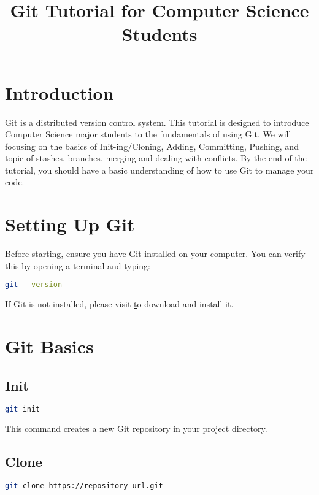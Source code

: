 \documentclass{article}
\title{Git Tutorial for Computer Science Students}
\author{}
\date{}
\begin{document}
\maketitle

\section{Introduction}

Git is a distributed version control system. This tutorial is designed to introduce Computer Science major students to the fundamentals of using Git. We will focusing on the basics of Init-ing/Cloning, Adding, Committing, Pushing, and topic of stashes, branches, merging and dealing with conflicts. By the end of the tutorial, you should have a basic understanding of how to use Git to manage your code.

\section{Setting Up Git}

Before starting, ensure you have Git installed on your computer. You can verify this by opening a terminal and typing:

\begin{lstlisting}[language=bash]
git --version
\end{lstlisting}

If Git is not installed, please visit \href{https://github.com/} to download and install it.

\section{Git Basics}


\subsection{Init}

\begin{lstlisting}[language=bash]
git init
\end{lstlisting}

This command creates a new Git repository in your project directory.

\subsection{Clone}

\begin{lstlisting}[language=bash]
git clone https://repository-url.git
\end{lstlisting}
\end{document}

